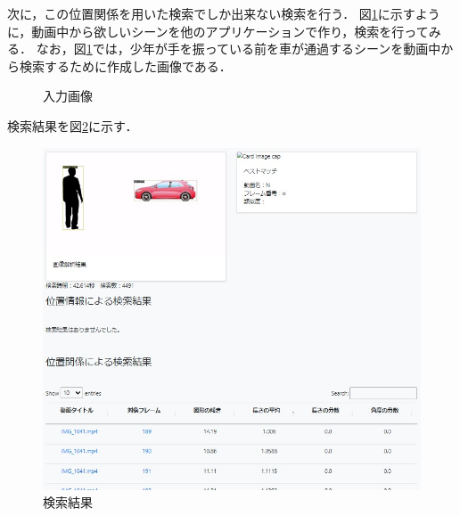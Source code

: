 \documentclass[a4j,12pt,dvipdfmx]{jreport}
\begin{document}
次に，この位置関係を用いた検索でしか出来ない検索を行う．
図\ref{fig:img_2-2}に示すように，動画中から欲しいシーンを他のアプリケーションで作り，検索を行ってみる．
なお，図\ref{fig:img_2-2}では，少年が手を振っている前を車が通過するシーンを動画中から検索するために作成した画像である．
\begin{figure}[b]
  \centering
  \caption{入力画像}
  \label{fig:img_2-2}
\end{figure}

検索結果を図\ref{fig:img_2-2-1}に示す．
\begin{figure}[b]
  \centering
  \includegraphics[width=13cm]{image/result_2_2_1.jpg}
  \caption{検索結果}
  \label{fig:img_2-2-1}
\end{figure}
\end{document}
